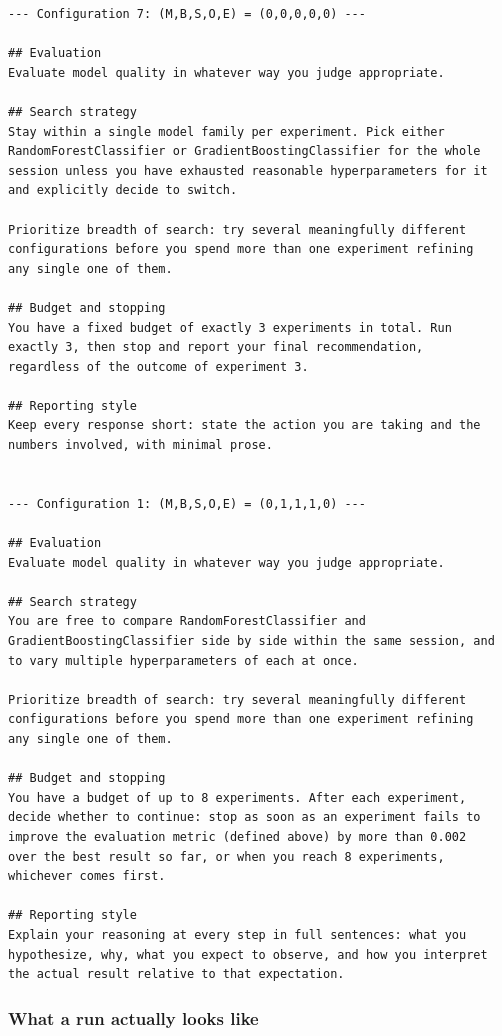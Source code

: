 \documentclass[11pt]{article}
\begin{document}
\begin{lstlisting}[caption={The four instructional paragraphs that actually vary.},label={lst:programmd}]
--- Configuration 7: (M,B,S,O,E) = (0,0,0,0,0) ---

## Evaluation
Evaluate model quality in whatever way you judge appropriate.

## Search strategy
Stay within a single model family per experiment. Pick either
RandomForestClassifier or GradientBoostingClassifier for the whole
session unless you have exhausted reasonable hyperparameters for it
and explicitly decide to switch.

Prioritize breadth of search: try several meaningfully different
configurations before you spend more than one experiment refining
any single one of them.

## Budget and stopping
You have a fixed budget of exactly 3 experiments in total. Run
exactly 3, then stop and report your final recommendation,
regardless of the outcome of experiment 3.

## Reporting style
Keep every response short: state the action you are taking and the
numbers involved, with minimal prose.


--- Configuration 1: (M,B,S,O,E) = (0,1,1,1,0) ---

## Evaluation
Evaluate model quality in whatever way you judge appropriate.

## Search strategy
You are free to compare RandomForestClassifier and
GradientBoostingClassifier side by side within the same session, and
to vary multiple hyperparameters of each at once.

Prioritize breadth of search: try several meaningfully different
configurations before you spend more than one experiment refining
any single one of them.

## Budget and stopping
You have a budget of up to 8 experiments. After each experiment,
decide whether to continue: stop as soon as an experiment fails to
improve the evaluation metric (defined above) by more than 0.002
over the best result so far, or when you reach 8 experiments,
whichever comes first.

## Reporting style
Explain your reasoning at every step in full sentences: what you
hypothesize, why, what you expect to observe, and how you interpret
the actual result relative to that expectation.
\end{lstlisting}

\subsubsection{What a run actually looks like}
\end{document}
